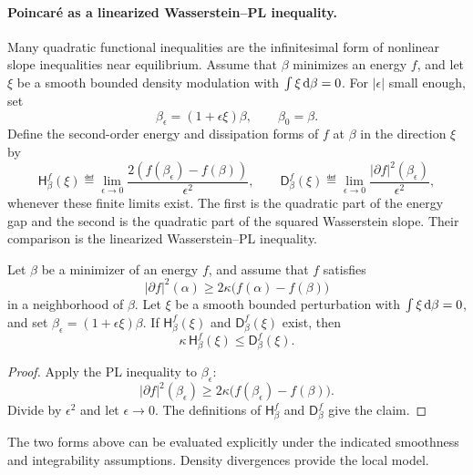 \paragraph{Poincar\'e as a linearized Wasserstein--PL inequality.}
Many quadratic functional inequalities are the infinitesimal form of nonlinear slope inequalities near equilibrium. Assume that \(\beta\) minimizes an energy \(f\), and let \(\xi\) be a smooth bounded density modulation with \(\int \xi\,\mathrm{d}\beta=0\). For \(|\epsilon|\) small enough, set
\[
\beta_\epsilon=(1+\epsilon\xi)\beta,
\qquad
\beta_0=\beta.
\]
Define the second-order energy and dissipation forms of \(f\) at \(\beta\) in the direction \(\xi\) by
\[
	\mathsf H^f_\beta(\xi)
	\eqdef
	\lim_{\epsilon\to0}
	\frac{2(f(\beta_\epsilon)-f(\beta))}{\epsilon^2},
	\qquad
	\mathsf D^f_\beta(\xi)
	\eqdef
	\lim_{\epsilon\to0}
	\frac{|\partial f|^2(\beta_\epsilon)}{\epsilon^2},
\]
whenever these finite limits exist. The first is the quadratic part of the energy gap and the second is the quadratic part of the squared Wasserstein slope. Their comparison is the linearized Wasserstein--PL inequality.

\begin{prop}\label{prop-linearized-pl-functional-inequality}
	Let \(\beta\) be a minimizer of an energy \(f\), and assume that \(f\) satisfies
	\[
		|\partial f|^2(\alpha)
		\geq
		2\kappa\bigl(f(\alpha)-f(\beta)\bigr)
	\]
	in a neighborhood of \(\beta\). Let \(\xi\) be a smooth bounded perturbation with \(\int\xi\,\mathrm{d}\beta=0\), and set \(\beta_\epsilon=(1+\epsilon\xi)\beta\). If \(\mathsf H^f_\beta(\xi)\) and \(\mathsf D^f_\beta(\xi)\) exist, then
	\[
		\kappa\,\mathsf H^f_\beta(\xi)
		\leq
		\mathsf D^f_\beta(\xi).
	\]
\end{prop}

\begin{proof}
	Apply the PL inequality to \(\beta_\epsilon\):
	\[
		|\partial f|^2(\beta_\epsilon)
		\geq
		2\kappa\bigl(f(\beta_\epsilon)-f(\beta)\bigr).
	\]
	Divide by \(\epsilon^2\) and let \(\epsilon\to0\). The definitions of \(\mathsf H^f_\beta\) and \(\mathsf D^f_\beta\) give the claim.
\end{proof}

The two forms above can be evaluated explicitly under the indicated smoothness and integrability assumptions. Density divergences provide the local model.

